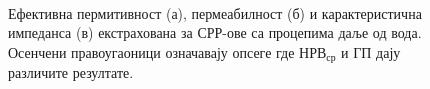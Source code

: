 \documentclass[main.tex]{subfiles}
\begin{document}
\begin{figure}[!t]
\centering
{}\hfill
{}\\
\caption{Ефективна пермитивност (а), пермеабилност (б) и карактеристична импеданса (в) екстрахована за СРР-ове са процепима даље од вода. Осенчени правоугаоници означавају опсеге где $НРВ_{ср}$ и ГП дају различите резултате.}
\label{fig10}
\end{figure} 

\end{document}
